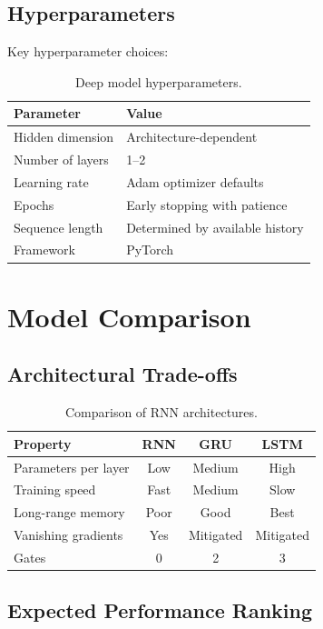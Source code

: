 \subsection{Hyperparameters}

Key hyperparameter choices:

\begin{table}[H]
\centering
\caption{Deep model hyperparameters.}
\begin{tabular}{ll}
\toprule
\textbf{Parameter} & \textbf{Value} \\
\midrule
Hidden dimension & Architecture-dependent \\
Number of layers & 1--2 \\
Learning rate & Adam optimizer defaults \\
Epochs & Early stopping with patience \\
Sequence length & Determined by available history \\
Framework & PyTorch \\
\bottomrule
\end{tabular}
\end{table}

\section{Model Comparison}

\subsection{Architectural Trade-offs}

\begin{table}[H]
\centering
\caption{Comparison of RNN architectures.}
\begin{tabular}{lccc}
\toprule
\textbf{Property} & \textbf{RNN} & \textbf{GRU} & \textbf{LSTM} \\
\midrule
Parameters per layer & Low & Medium & High \\
Training speed & Fast & Medium & Slow \\
Long-range memory & Poor & Good & Best \\
Vanishing gradients & Yes & Mitigated & Mitigated \\
Gates & 0 & 2 & 3 \\
\bottomrule
\end{tabular}
\end{table}

\subsection{Expected Performance Ranking}


